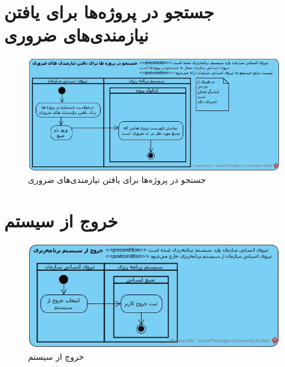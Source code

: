 \section{جستجو در پروژه‌ها برای یافتن نیازمندی‌های ضروری}
\begin{figure}[H]
	\centering
	\includegraphics[scale=0.7]{img/activity/SearchForEssentialRequirements}
	\caption{جستجو در پروژه‌ها برای یافتن نیازمندی‌های ضروری}
\end{figure}


\section{خروج از سیستم}
\begin{figure}[H]
	\centering
	\includegraphics[scale=0.8]{img/activity/SignOut}
	\caption{خروج از سیستم}
\end{figure}


